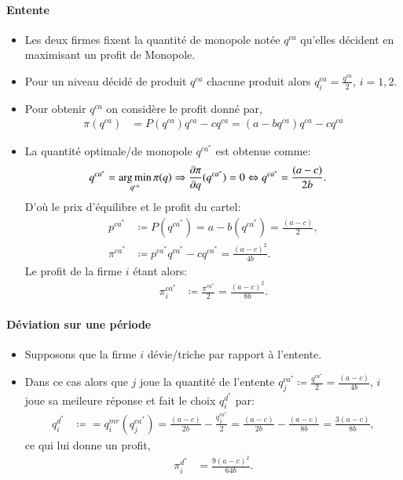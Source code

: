 \documentclass[notes, ignorenonframetext, compress, 9pt, xcolor=svgnames, aspectratio=169]{beamer}
\begin{document}
\begin{frame}
[allowframebreaks]{\insertsection}
\framesubtitle{Entente\\}

    \begin{itemize}
        \item Les deux firmes fixent la quantité de monopole notée $q^{ca}$ qu'elles décident en maximisant un profit de Monopole.
        \item Pour un niveau décidé de produit $q^{ca}$ chacune produit alors $q_i^{ca} = \frac{q^{ca}}{2}$, $i=1, 2$.
        \item Pour obtenir  $q^{ca}$  on considère le profit donné par,
        \begin{align*}
            \pi(q^{ca}) &= P(q^{ca})q^{ca} - cq^{ca} = (a-bq^{ca})q^{ca} - cq^{ca}
        \end{align*}
        \item La quantité optimale/de monopole $q^{ca^*}$ est obtenue comme:
        \begin{align*}
            q^{ca^*} &=\argmin_{q^{ca}}  \pi(q) \Rightarrow \frac{\partial \pi}{\partial q}( q^{ca^*}) = 0 
            \Leftrightarrow  q^{ca^*} = \frac{(a-c)}{2b}.
        \end{align*}
        D'où le prix d'équilibre et le profit du cartel:
        \begin{align*}
        p^{ca^*} &\coloneqq P(q^{ca^*}) = a - b\left(q^{ca^*}\right) = \frac{(a-c)}{2},\\
        \pi ^{ca^*} &\coloneqq p^{ca^*}  q^{ca^*}  - c q^{ca^*}  =  \frac{(a-c)^2}{4b}.
        \end{align*}
        Le profit de la firme $i$ étant alors:
        \begin{align*}
        \pi_i ^{ca^*} &\coloneqq \frac{\pi ^{ca^*}}{2} = \frac{(a-c)^2}{8b}.
        \end{align*}
    \end{itemize}
    \end{frame}

\begin{frame}
[allowframebreaks]{\insertsection}
\framesubtitle{Déviation sur une période\\}
\begin{itemize}
\item Supposons que la firme $i$ dévie/triche par rapport à l'entente.
\item Dans ce cas alors que $j$ joue la quantité de l'entente  $q_j^{ca^*} \coloneqq \frac{q^{ca^*}}{2} =  \frac{(a-c)}{4b}$, $i$ joue sa meileure réponse 
et fait le choix $q_i^{d^*}$ par:
\begin{align*}
q_i^{d^*} &\coloneqq = q_i^{mr}(q_j^{ca^*} ) = \frac{(a-c)}{2b} - \frac{q_j^{ca^*} }{2} = \frac{(a-c)}{2b} - \frac{(a-c)}{8b} = \frac{3(a-c)}{8b},
\end{align*}
ce qui lui donne un profit,
\begin{align*}
\pi_i^{d^*} &= \frac{9(a-c)^2}{64b}.
\end{align*}
\end{itemize}
    \end{frame}
    
\end{document}
